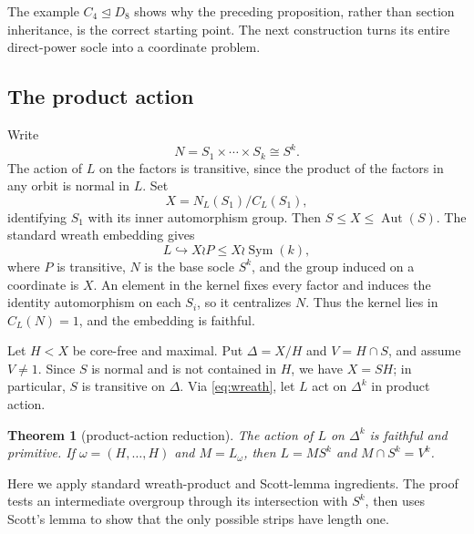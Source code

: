 \documentclass[11pt]{amsart}
\newcommand{\Aut}{\operatorname{Aut}}
\newcommand{\Sym}{\operatorname{Sym}}
\newtheorem{theorem}{Theorem}[section]
\theoremstyle{definition}
\begin{document}
The example \(C_4\trianglelefteq D_8\) shows why the preceding proposition,
rather than section inheritance, is the correct starting point.  The next
construction turns its entire direct-power socle into a coordinate problem.

\subsection{The product action}

Write
\[
N=S_1\times\cdots\times S_k\cong S^k.
\]
The action of \(L\) on the factors is transitive, since the product of the
factors in any orbit is normal in \(L\).  Set
\begin{equation}\label{eq:coordinate}
X=N_L(S_1)/C_L(S_1),
\end{equation}
identifying \(S_1\) with its inner automorphism group.  Then
\(S\leq X\leq\Aut(S)\).  The standard wreath embedding gives
\begin{equation}\label{eq:wreath}
L\hookrightarrow X\wr P\leq X\wr\Sym(k),
\end{equation}
where \(P\) is transitive, \(N\) is the base socle \(S^k\), and the group
induced on a coordinate is \(X\).  An element in the kernel fixes every
factor and induces the identity automorphism on each \(S_i\), so it
centralizes \(N\).  Thus the kernel lies in \(C_L(N)=1\), and the embedding
is faithful.

Let \(H<X\) be core-free and maximal.  Put
\(\Delta=X/H\) and \(V=H\cap S\), and assume \(V\ne1\).  Since \(S\) is
normal and is not contained in \(H\), we have \(X=SH\); in particular,
\(S\) is transitive on \(\Delta\).  Via \eqref{eq:wreath}, let \(L\) act on
\(\Delta^k\) in product action.

\begin{theorem}[product-action reduction]\label{thm:product-lifting}
The action of \(L\) on \(\Delta^k\) is faithful and primitive.  If
\(\omega=(H,\ldots,H)\) and \(M=L_\omega\), then
\(L=MS^k\) and \(M\cap S^k=V^k\).
\end{theorem}

Here we apply standard wreath-product and Scott-lemma ingredients.  The proof
tests an intermediate overgroup through its intersection with \(S^k\), then
uses Scott's lemma to show that the only possible strips have length one.
\end{document}
